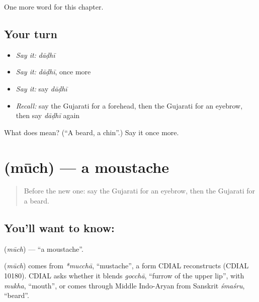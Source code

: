 \begin{grammarlens}[title={What you've built}]
One more word for this chapter.
\end{grammarlens}

\subsection*{Your turn}
\begin{itemize}
\raggedright
  \item \emph{Say it:} \emph{dāḍhī}
  \item \emph{Say it:} \emph{dāḍhī}, once more
  \item \emph{Say it:} say \emph{dāḍhī}
  \item \emph{Recall:} say the Gujarati for a forehead, then the Gujarati for an eyebrow, then say \emph{dāḍhī} again
\end{itemize}

\begin{tcolorbox}[breakable,colback=teal!4,colframe=teal!35!black,title={Before you move on}]
What does  mean? (\textquotedblleft{}A beard, a chin\textquotedblright{}.) Say it once more.
\end{tcolorbox}
\section[\texorpdfstring{\gu{મૂછ} (mūch)}{મૂછ (mūch)}]{ (mūch) — a moustache}

\label{lesson:GU-C125-much}



\begin{quote}
Before the new one: say the Gujarati for an eyebrow, then the Gujarati for a beard.
\end{quote}

\subsection*{You'll want to know: }
\textbf{} (\emph{mūch}) — \textquotedblleft{}a moustache\textquotedblright{}.

\begin{cousinweb}
\textbf{} (\emph{mūch}) comes from \emph{*mucchā}, \textquotedblleft{}mustache\textquotedblright{}, a form CDIAL reconstructs (CDIAL 10180). CDIAL asks whether it blends \emph{gocchā}, \textquotedblleft{}furrow of the upper lip\textquotedblright{}, with \emph{mukha}, \textquotedblleft{}mouth\textquotedblright{}, or comes through Middle Indo-Aryan from Sanskrit \emph{śmaśru}, \textquotedblleft{}beard\textquotedblright{}.
\end{cousinweb}

